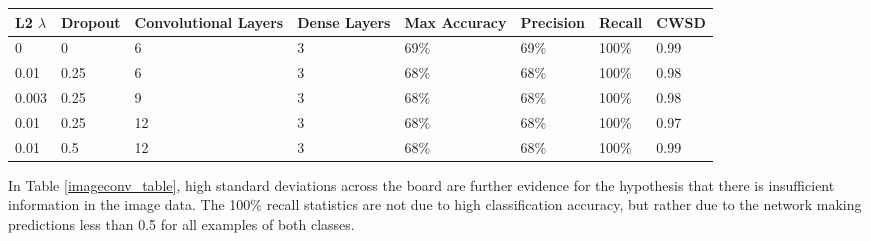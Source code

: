 \documentclass[10pt]{article}
\begin{document}
\begin{minipage}{\textwidth}
    \begin{center}
         \label{imageconv_table}
        \begin{tabular}{|l|l|l|l|l|l|l|l|}
            \hline
            L2 $\lambda$ & Dropout & Convolutional Layers & Dense Layers & Max Accuracy & Precision & Recall & CWSD \\
            \hline
            0 & 0 & 6 & 3 & 69\% & 69\% & 100\% & 0.99 \\
            \hline
            0.01 & 0.25 & 6 & 3 & 68\% & 68\% & 100\% & 0.98 \\
            \hline
            0.003 & 0.25 & 9 & 3 & 68\% & 68\% & 100\% & 0.98 \\
            \hline
            0.01 & 0.25 & 12 & 3 & 68\% & 68\% & 100\% & 0.97 \\
            \hline
            0.01 & 0.5 & 12 & 3 & 68\% & 68\% & 100\% & 0.99 \\
            \hline
        \end{tabular}
    \end{center}
\end{minipage}

In Table \ref{imageconv_table}, high standard deviations across the board are further evidence for the hypothesis that there is insufficient information in the image data. The 100\% recall statistics are not due to high classification accuracy, but rather due to the network making predictions less than 0.5 for all examples of both classes.
\end{document}
